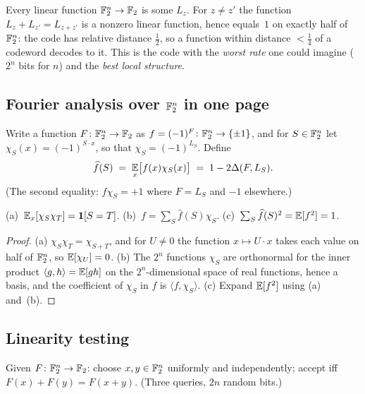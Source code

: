 \noindent
Every linear function $\mathbb{F}_2^n\to\mathbb{F}_2$ is some $L_z$.  For $z\ne z'$ the function $L_z+L_{z'}=L_{z+z'}$ is a nonzero linear function, hence equals~$1$ on exactly half of $\mathbb{F}_2^n$:
the code has relative distance $\tfrac12$, so a function within distance $<\tfrac14$ of a codeword decodes to it.
This is the code with the \emph{worst rate} one could imagine ($2^n$ bits for $n$) and the \emph{best local structure}.

\subsection{Fourier analysis over $\mathbb{F}_2^n$ in one page}

Write a function $F\colon\mathbb{F}_2^n\to\mathbb{F}_2$ as $f=(-1)^F\colon\mathbb{F}_2^n\to\{\pm1\}$, and for $S\in\mathbb{F}_2^n$ let $\chi_S(x)=(-1)^{S\cdot x}$, so that $\chi_S=(-1)^{L_S}$.  Define
\[
  \widehat f(S)\;=\;\operatorname*{\mathbb{E}}_{x}\bigl[f(x)\chi_S(x)\bigr]\;=\;1-2\Delta(F,L_S).
\]
(The second equality: $f\chi_S=+1$ where $F=L_S$ and $-1$ elsewhere.)

\begin{lemma}\label{lem:fourier}
(a)~$\operatorname*{\mathbb{E}}_x[\chi_S\chi_T]=\mathbf 1[S=T]$.  (b)~$f=\sum_S\widehat f(S)\chi_S$.  (c)~$\sum_S\widehat f(S)^2=\operatorname*{\mathbb{E}}[f^2]=1$.
\end{lemma}
\begin{proof}
(a) $\chi_S\chi_T=\chi_{S+T}$, and for $U\ne0$ the function $x\mapsto U\cdot x$ takes each value on half of $\mathbb{F}_2^n$, so $\operatorname*{\mathbb{E}}[\chi_U]=0$.
(b) The $2^n$ functions $\chi_S$ are orthonormal for the inner product $\langle g,h\rangle=\operatorname*{\mathbb{E}}[gh]$ on the $2^n$-dimensional space of real functions, hence a basis, and the coefficient of $\chi_S$ in $f$ is $\langle f,\chi_S\rangle$.
(c) Expand $\operatorname*{\mathbb{E}}[f^2]$ using (a) and~(b).
\end{proof}

\subsection{Linearity testing}

\begin{definition}\label{def:blr}
Given $F\colon\mathbb{F}_2^n\to\mathbb{F}_2$: choose $x,y\in\mathbb{F}_2^n$ uniformly and independently; accept iff $F(x)+F(y)=F(x+y)$.  (Three queries, $2n$ random bits.)
\end{definition}

